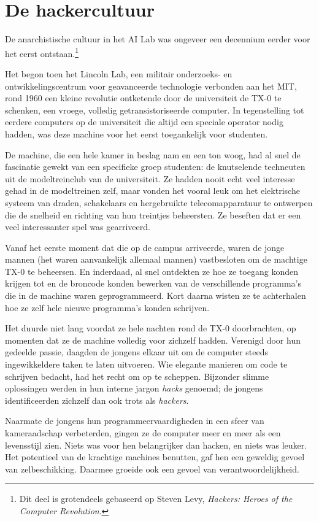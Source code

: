 \documentclass[
  a5paper,
  smalldemyvopaper,11pt,twoside,onecolumn,openright,extrafontsizes,
hidelinks]{memoir}
\begin{document}
\section{De hackercultuur}\label{de-hackercultuur}

De anarchistische cultuur in het AI Lab was ongeveer een decennium
eerder voor het eerst ontstaan.\footnote{Dit deel is grotendeels
  gebaseerd op Steven Levy, \emph{Hackers: Heroes of the Computer
  Revolution}.}

Het begon toen het Lincoln Lab, een militair onderzoeks- en
ontwikkelingscentrum voor geavanceerde technologie verbonden aan het
MIT, rond 1960 een kleine revolutie ontketende door de universiteit de
TX-0 te schenken, een vroege, volledig getransistoriseerde computer. In
tegenstelling tot eerdere computers op de universiteit die altijd een
speciale operator nodig hadden, was deze machine voor het eerst
toegankelijk voor studenten.

De machine, die een hele kamer in beslag nam en een ton woog, had al
snel de fascinatie gewekt van een specifieke groep studenten: de
knutselende techneuten uit de modeltreinclub van de universiteit. Ze
hadden nooit echt veel interesse gehad in de modeltreinen zelf, maar
vonden het vooral leuk om het elektrische systeem van draden,
schakelaars en hergebruikte telecomapparatuur te ontwerpen die de
snelheid en richting van hun treintjes beheersten. Ze beseften dat er
een veel interessanter spel was gearriveerd.

Vanaf het eerste moment dat die op de campus arriveerde, waren de jonge
mannen (het waren aanvankelijk allemaal mannen) vastbesloten om de
machtige TX-0 te beheersen. En inderdaad, al snel ontdekten ze hoe ze
toegang konden krijgen tot en de broncode konden bewerken van de
verschillende programma's die in de machine waren geprogrammeerd. Kort
daarna wisten ze te achterhalen hoe ze zelf hele nieuwe programma's
konden schrijven.

Het duurde niet lang voordat ze hele nachten rond de TX-0 doorbrachten,
op momenten dat ze de machine volledig voor zichzelf hadden. Verenigd
door hun gedeelde passie, daagden de jongens elkaar uit om de computer
steeds ingewikkeldere taken te laten uitvoeren. Wie elegante manieren om
code te schrijven bedacht, had het recht om op te scheppen. Bijzonder
slimme oplossingen werden in hun interne jargon \emph{hacks} genoemd; de
jongens identificeerden zichzelf dan ook trots als \emph{hackers}.

Naarmate de jongens hun programmeervaardigheden in een sfeer van
kameraadschap verbeterden, gingen ze de computer meer en meer als een
levensstijl zien. Niets was voor hen belangrijker dan hacken, en niets
was leuker. Het potentieel van de krachtige machines benutten, gaf hen
een geweldig gevoel van zelbeschikking. Daarmee groeide ook een gevoel
van verantwoordelijkheid.
\end{document}
